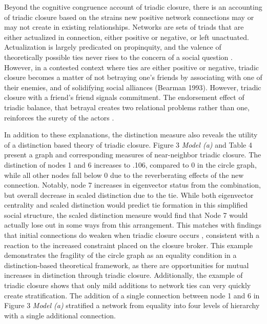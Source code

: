 \documentclass[12pt]{article}
\begin{document}
Beyond the cognitive congruence account of triadic closure, there is an accounting of triadic closure based on the strains new positive network connections may or may not create in existing relationships. Networks are sets of triads that are either actualized in connection, either positive or negative, or left unactuated. Actualization is largely predicated on propinquity, and the valence of theoretically possible ties never rises to the concern of a social question \citep{feld1981focused, feld1982social, mollenhorst2011shared}. However, in a contested context where ties are either positive or negative, triadic closure becomes a matter of not betraying one's friends by associating with one of their enemies, and of solidifying social alliances (Bearman 1993). However, triadic closure with a friend's friend signals commitment. The endorsement effect of triadic balance, that betrayal creates two relational problems rather than one, reinforces the surety of the actors \citep{yoon2013exchange}. 

In addition to these explanations, the distinction measure also reveals the utility of a distinction based theory of triadic closure. Figure 3 \textit{Model (a)} and Table 4 present a graph and corresponding measures of near-neighbor triadic closure. The distinction of nodes 1 and 6 increases to .106, compared to 0 in the circle graph, while all other nodes fall below 0 due to the reverberating effects of the new connection. Notably, node 7 increases in eigenvector status from the combination, but overall decrease in scaled distinction due to the tie. While both eigenvector centrality and scaled distinction would predict tie formation in this simplified social structure, the scaled distinction measure would find that Node 7 would actually lose out in some ways from this arrangement. This matches with findings that initial connections do weaken when triadic closure occurs \citep{huang2018will}, consistent with a reaction to the increased constraint placed on the closure broker. This example demonstrates the fragility of the circle graph as an equality condition in a distinction-based theoretical framework, as there are opportunities for mutual increases in distinction through triadic closure. Additionally, the  example of triadic closure shows that only mild additions to network ties can very quickly create stratification. The addition of a single connection between node 1 and 6 in Figure 3 \textit{Model (a)} stratified a network from equality into four levels of hierarchy with a single additional connection. 
\end{document}
